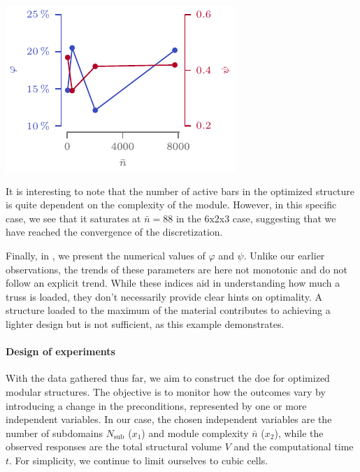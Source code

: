 \begin{marginfigure}
    \centering
    \includegraphics[width=\linewidth]{figures/05_cellular_opt/00_module_complexity_tab/comp_tab_param.pdf}
    \caption{}
    \label{fig:05_comp_param}
\end{marginfigure}

It is interesting to note that the number of active bars in the optimized structure is quite dependent on the complexity of the module. However, in this specific case, we see that it saturates at $\bar{n}=88$ in the 6x2x3 case, suggesting that we have reached the convergence of the discretization.

Finally, in , we present the numerical values of $\varphi$ and $\psi$. Unlike our earlier observations, the trends of these parameters are here not monotonic and do not follow an explicit trend. While these indices aid in understanding how much a truss is loaded, they don't necessarily provide clear hints on optimality. A structure loaded to the maximum of the material contributes to achieving a lighter design but is not sufficient, as this example demonstrates.

\paragraph{Design of experiments}
With the data gathered thus far, we aim to construct the \gls{doe} for optimized modular structures. The objective is to monitor how the outcomes vary by introducing a change in the preconditions, represented by one or more independent variables. In our case, the chosen independent variables are the number of subdomains $N_\text{sub}$ ($x_1$) and module complexity $\bar{n}$ ($x_2$), while the observed responses are the total structural volume $V$ and the computational time $t$. For simplicity, we continue to limit ourselves to cubic cells.


